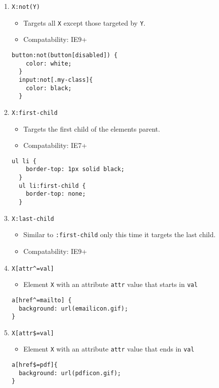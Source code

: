 \documentclass[10pt, twocolumn]{article}
\begin{document}
\begin{enumerate}
\item {\texttt{X:not(Y)}}
  \begin{itemize}
    \item Targets all \texttt{X} except those targeted by \texttt{Y}.
    \item Compatability: IE9+
  \end{itemize}
  \begin{lstlisting}[frame=single]
  button:not(button[disabled]) {
    color: white;
  }
  input:not[.my-class]{
    color: black;
  }
  \end{lstlisting}

\item {\texttt{X:first-child}}
  \begin{itemize}
    \item Targets the first child of the elements parent.  
    \item Compatability: IE7+
  \end{itemize}
  \begin{lstlisting}[frame=single]
  ul li {
    border-top: 1px solid black;
  }
  ul li:first-child {
    border-top: none;
  }
  \end{lstlisting}

\item {\texttt{X:last-child}}
  \begin{itemize}
    \item Similar to \texttt{:first-child} only this time it targets the last child.
    \item Compatability: IE9+
  \end{itemize}

\item \texttt{X[attr\^{}=val]}
\begin{itemize}
\item Element \texttt{X} with an attribute \texttt{attr} value that starts in \texttt{val}
\end{itemize}
\begin{lstlisting}[frame=single]
a[href^=mailto] {
  background: url(emailicon.gif);
}
\end{lstlisting}

\item \texttt{X[attr\$=val]}
\begin{itemize}
\item Element \texttt{X} with an attribute \texttt{attr} value that ends in \texttt{val}
\end{itemize}
\begin{lstlisting}[frame=single]
a[href$=pdf]{
  background: url(pdficon.gif);
}
\end{lstlisting}


\end{enumerate}
\end{document}
